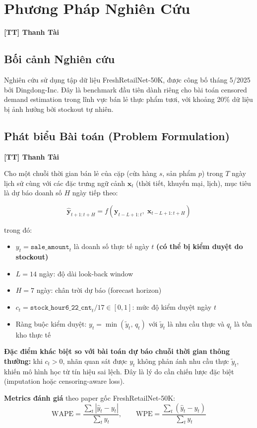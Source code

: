 \documentclass[12pt,a4paper]{report}
\newcommand{\ownerTT}{\colorbox{red!15}{\textbf{[TT] Thanh Tài}}}
\begin{document}
\chapter{Phương Pháp Nghiên Cứu}
\ownerTT

\section{Bối cảnh Nghiên cứu}

Nghiên cứu sử dụng tập dữ liệu FreshRetailNet-50K, được công bố tháng 5/2025 bởi Dingdong-Inc. Đây là benchmark đầu tiên dành riêng cho bài toán censored demand estimation trong lĩnh vực bán lẻ thực phẩm tươi, với khoảng 20\% dữ liệu bị ảnh hưởng bởi stockout tự nhiên.

\section{Phát biểu Bài toán (Problem Formulation)}
\ownerTT

Cho một chuỗi thời gian bán lẻ của cặp (cửa hàng $s$, sản phẩm $p$) trong $T$ ngày lịch sử cùng với các đặc trưng ngữ cảnh $\mathbf{x}_t$ (thời tiết, khuyến mại, lịch), mục tiêu là dự báo doanh số $H$ ngày tiếp theo:

\[
\hat{\mathbf{y}}_{t+1:t+H} = f\!\left(\mathbf{y}_{t-L+1:t},\; \mathbf{x}_{t-L+1:t+H}\right)
\]

trong đó:
\begin{itemize}
    \item $y_t = \texttt{sale\_amount}_t$ là doanh số thực tế ngày $t$ \textbf{(có thể bị kiểm duyệt do stockout)}
    \item $L = 14$ ngày: độ dài look-back window
    \item $H = 7$ ngày: chân trời dự báo (forecast horizon)
    \item $c_t = \texttt{stock\_hour6\_22\_cnt}_t / 17 \in [0,1]$: mức độ kiểm duyệt ngày $t$
    \item Ràng buộc kiểm duyệt: $y_t = \min(\tilde{y}_t,\, q_t)$ với $\tilde{y}_t$ là nhu cầu thực và $q_t$ là tồn kho thực tế
\end{itemize}

\textbf{Đặc điểm khác biệt so với bài toán dự báo chuỗi thời gian thông thường:} khi $c_t > 0$, nhãn quan sát được $y_t$ không phản ánh nhu cầu thực $\tilde{y}_t$, khiến mô hình học từ tín hiệu sai lệch. Đây là lý do cần chiến lược đặc biệt (imputation hoặc censoring-aware loss).

\textbf{Metrics đánh giá} theo paper gốc FreshRetailNet-50K:
\[
\text{WAPE} = \frac{\displaystyle\sum_{t} |\hat{y}_t - y_t|}{\displaystyle\sum_{t} y_t}, \qquad
\text{WPE} = \frac{\displaystyle\sum_{t} (\hat{y}_t - y_t)}{\displaystyle\sum_{t} y_t}
\]
\end{document}
